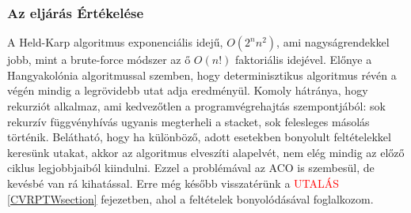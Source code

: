 \subsubsection{Az eljárás Értékelése}
A Held-Karp algoritmus exponenciális idejű, \(O(2^nn^2)\), ami nagyságrendekkel jobb, mint a brute-force módszer az ő \(O(n!)\) faktoriális idejével. Előnye a Hangyakolónia algoritmussal szemben, hogy determinisztikus algoritmus révén a végén mindig a legrövidebb utat adja eredményül. Komoly hátránya, hogy rekurziót alkalmaz, ami kedvezőtlen a programvégrehajtás szempontjából: sok rekurzív függvényhívás ugyanis megterheli a stacket, sok felesleges másolás történik. Belátható, hogy ha különböző, adott esetekben bonyolult feltételekkel keresünk utakat, akkor az algoritmus elveszíti alapelvét, nem elég mindig az előző ciklus legjobbjaiból kiindulni. Ezzel a problémával az ACO is szembesül, de kevésbé van rá kihatással. Erre még később visszatérünk a \textcolor{red}{UTALÁS} \ref{CVRPTWsection} fejezetben, ahol a feltételek bonyolódásával foglalkozom.

